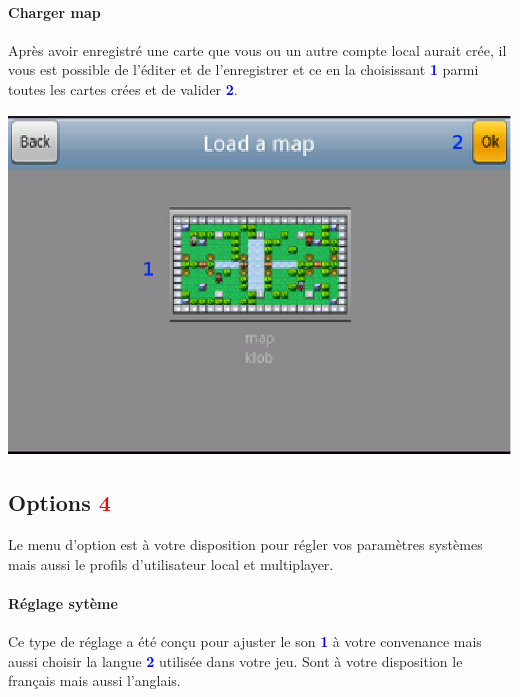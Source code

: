 	\paragraph{Charger map\\}
	Après avoir enregistré une carte que vous ou un autre compte local aurait crée,
	il vous est possible de l'éditer et de l'enregistrer et ce en la choisissant
	\textcolor{blue}{\textbf{1}} parmi toutes les cartes crées et de valider
	\textcolor{blue}{\textbf{2}}. 
	
	\begin{center}
		\includegraphics[scale=0.9]{Manuel/Img/14.eps}
	\end{center}
	

\subsection{Options \textcolor{red}{4}}
	Le menu d'option est à votre disposition pour régler vos paramètres systèmes
	mais aussi le profils d'utilisateur local et multiplayer.
	
	\paragraph{Réglage sytème\\}
	Ce type de réglage a été conçu pour ajuster le son
	\textcolor{blue}{\textbf{1}} à votre convenance mais aussi choisir la langue
	\textcolor{blue}{\textbf{2}} utilisée dans votre jeu. Sont à votre disposition
	le français mais aussi l'anglais.
	
